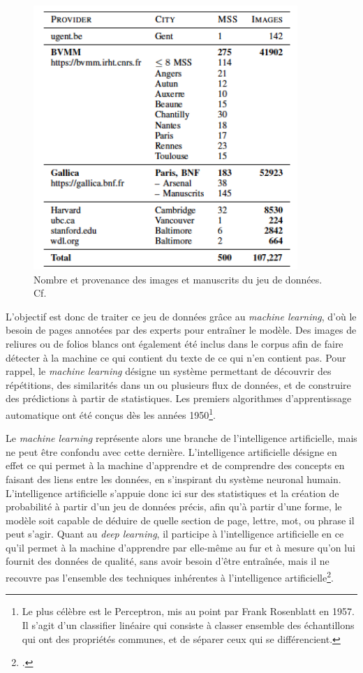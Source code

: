 \documentclass[a4paper,12pt,twoside]{book}
\begin{document}
	\begin{figure}[!h]
    \centering
    \includegraphics[width=10cm]{img/ML/provenance_dataset_annotated.png}
    \caption{Nombre et provenance des images et manuscrits du jeu de données. Cf. \cite[p. 8]{annotated_dataset_book_hours}}
    \end{figure}
    \clearpage
    
    L'objectif est donc de traiter ce jeu de données grâce au \textit{machine learning}, d'où le besoin de pages annotées par des experts pour entraîner le modèle. Des images de reliures ou de folios blancs ont également été inclus dans le corpus afin de faire détecter à la machine ce qui contient du texte de ce qui n'en contient pas. Pour rappel, le \textit{machine learning} désigne un système permettant de découvrir des répétitions, des similarités dans un ou plusieurs flux de données, et de construire des prédictions à partir de statistiques. Les premiers algorithmes d'apprentissage automatique ont été conçus dès les années 1950\footnote{Le plus célèbre est le Perceptron, mis au point par Frank Rosenblatt en 1957. Il s'agit d'un classifier linéaire qui consiste à classer ensemble des échantillons qui ont des propriétés communes, et de séparer ceux qui se différencient.}.
    
    Le \textit{machine learning} représente alors une branche de l'intelligence artificielle, mais ne peut être confondu avec cette dernière. L'intelligence artificielle désigne en effet ce qui permet à la machine d'apprendre et de comprendre des concepts en faisant des liens entre les données, en s'inspirant du système neuronal humain. L'intelligence artificielle s'appuie donc ici sur des statistiques et la création de probabilité à partir d'un jeu de données précis, afin qu'à partir d'une forme, le modèle soit capable de déduire de quelle section de page, lettre, mot, ou phrase il peut s'agir. Quant au \textit{deep learning}, il participe à l'intelligence artificielle en ce qu'il permet à la machine d'apprendre par elle-même au fur et à mesure qu'on lui fournit des données de qualité, sans avoir besoin d'être entraînée, mais il ne recouvre pas l'ensemble des techniques inhérentes à l'intelligence artificielle\footcite{Automatisation_ML}. \\
    
\end{document}
